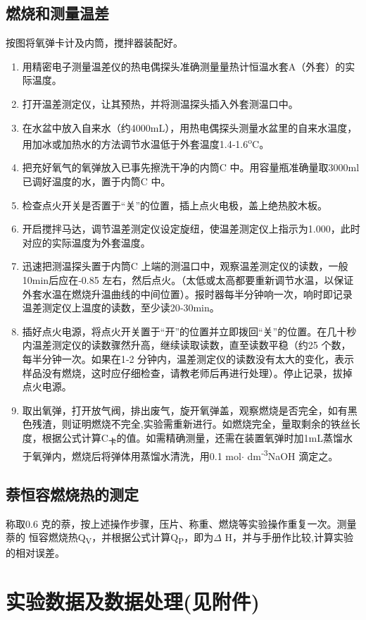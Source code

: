 \documentclass[11pt]{report}
\begin{document}
\section{燃烧和测量温差}
\label{sec:orgbc365af}
按图将氧弹卡计及内筒，搅拌器装配好。
\begin{enumerate}
\item 用精密电子测量温差仪的热电偶探头准确测量量热计恒温水套A（外套）的实际温度。
\item 打开温差测定仪，让其预热，并将测温探头插入外套测温口中。
\item 在水盆中放入自来水（约4000mL），用热电偶探头测量水盆里的自来水温度，用加冰或加热水的方法调节水温低于外套温度1.4‐1.6\textsuperscript{o}C。
\item 把充好氧气的氧弹放入已事先擦洗干净的内筒C 中。用容量瓶准确量取3000ml 已调好温度的水，置于内筒C 中。
\item 检查点火开关是否置于“关”的位置，插上点火电极，盖上绝热胶木板。
\item 开启搅拌马达，调节温差测定仪设定旋纽，使温差测定仪上指示为1.000，此时对应的实际温度为外套温度。
\item 迅速把测温探头置于内筒C 上端的测温口中，观察温差测定仪的读数，一般10min后应在‐0.85 左右，然后点火。（太低或太高都要重新调节水温，以保证外套水温在燃烧升温曲线的中间位置）。报时器每半分钟响一次，响时即记录温差测定仪上温度的读数，至少读20‐30min。
\item 插好点火电源，将点火开关置于“开”的位置并立即拨回“关”的位置。在几十秒内温差测定仪的读数骤然升高，继续读取读数，直至读数平稳（约25 个数，每半分钟一次。如果在1‐2 分钟内，温差测定仪的读数没有太大的变化，表示样品没有燃烧，这时应仔细检查，请教老师后再进行处理）。停止记录，拔掉点火电源。
\item 取出氧弹，打开放气阀，排出废气，旋开氧弹盖，观察燃烧是否完全，如有黑色残渣，则证明燃烧不完全,实验需重新进行。如燃烧完全，量取剩余的铁丝长度，根据公式计算C\textsubscript{卡}的值。如需精确测量，还需在装置氧弹时加1mL蒸馏水于氧弹内，燃烧后将弹体用蒸馏水清洗，用0.1 mol\(\cdot\) dm\textsuperscript{‐3}NaOH 滴定之。
\end{enumerate}
\section{萘恒容燃烧热的测定}
\label{sec:org1c34abb}
称取0.6 克的萘，按上述操作步骤，压片、称重、燃烧等实验操作重复一次。测量萘的
恒容燃烧热Q\textsubscript{V}，并根据公式计算Q\textsubscript{P}，即为\(\Delta\) H，并与手册作比较,计算实验的相对误差。
\chapter{实验数据及数据处理(见附件)}
\label{sec:org71493dd}
\end{document}

